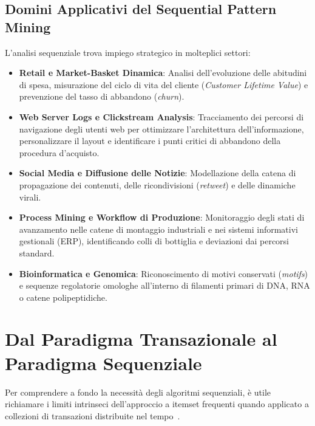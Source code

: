 \subsection{Domini Applicativi del Sequential Pattern Mining}
L'analisi sequenziale trova impiego strategico in molteplici settori:
\begin{itemize}
    \item \textbf{Retail e Market-Basket Dinamica}: Analisi dell'evoluzione delle abitudini di spesa, misurazione del ciclo di vita del cliente (\textit{Customer Lifetime Value}) e prevenzione del tasso di abbandono (\textit{churn}).
    \item \textbf{Web Server Logs e Clickstream Analysis}: Tracciamento dei percorsi di navigazione degli utenti web per ottimizzare l'architettura dell'informazione, personalizzare il layout e identificare i punti critici di abbandono della procedura d'acquisto.
    \item \textbf{Social Media e Diffusione delle Notizie}: Modellazione della catena di propagazione dei contenuti, delle ricondivisioni (\textit{retweet}) e delle dinamiche virali.
    \item \textbf{Process Mining e Workflow di Produzione}: Monitoraggio degli stati di avanzamento nelle catene di montaggio industriali e nei sistemi informativi gestionali (ERP), identificando colli di bottiglia e deviazioni dai percorsi standard.
    \item \textbf{Bioinformatica e Genomica}: Riconoscimento di motivi conservati (\textit{motifs}) e sequenze regolatorie omologhe all'interno di filamenti primari di DNA, RNA o catene polipeptidiche.
\end{itemize}

\FloatBarrier
\section{Dal Paradigma Transazionale al Paradigma Sequenziale}
\label{sec:dm-from-itemsets-to-sequences}

Per comprendere a fondo la necessità degli algoritmi sequenziali, è utile richiamare i limiti intrinseci dell'approccio a itemset frequenti quando applicato a collezioni di transazioni distribuite nel tempo~\cite{tan2018}.

\FloatBarrier

